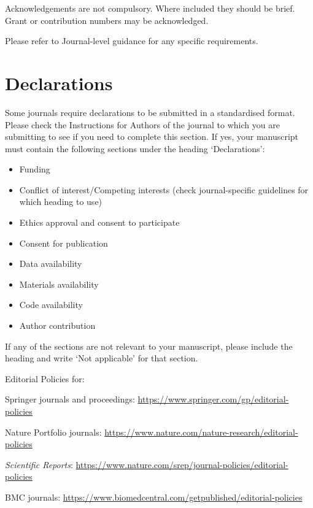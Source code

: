 \documentclass[pdflatex,sn-mathphys-num]{sn-jnl}%
\theoremstyle{thmstyleone}%
\theoremstyle{thmstyletwo}%
\theoremstyle{thmstylethree}%
\begin{document}
Acknowledgements are not compulsory. Where included they should be brief. Grant or contribution numbers may be acknowledged.

Please refer to Journal-level guidance for any specific requirements.

\section*{Declarations}

Some journals require declarations to be submitted in a standardised format. Please check the Instructions for Authors of the journal to which you are submitting to see if you need to complete this section. If yes, your manuscript must contain the following sections under the heading `Declarations':

\begin{itemize}
\item Funding
\item Conflict of interest/Competing interests (check journal-specific guidelines for which heading to use)
\item Ethics approval and consent to participate
\item Consent for publication
\item Data availability 
\item Materials availability
\item Code availability 
\item Author contribution
\end{itemize}

\noindent
If any of the sections are not relevant to your manuscript, please include the heading and write `Not applicable' for that section. 

\bigskip
\begin{flushleft}%
Editorial Policies for:

\bigskip\noindent
Springer journals and proceedings: \url{https://www.springer.com/gp/editorial-policies}

\bigskip\noindent
Nature Portfolio journals: \url{https://www.nature.com/nature-research/editorial-policies}

\bigskip\noindent
\textit{Scientific Reports}: \url{https://www.nature.com/srep/journal-policies/editorial-policies}

\bigskip\noindent
BMC journals: \url{https://www.biomedcentral.com/getpublished/editorial-policies}
\end{flushleft}
\end{document}
